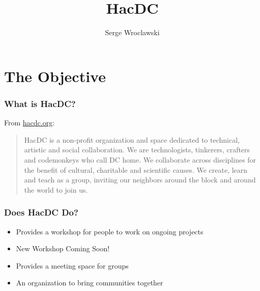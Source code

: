 \documentclass[notes]{beamer}
\title{HacDC}
\author{Serge Wroclawski}
\begin{document}
\section{The Objective}

\begin{frame}
  \frametitle{What is HacDC?}
  From \href{http://www.hacdc.org}{hacdc.org}:
  \begin{quote}
    HacDC is a non-profit organization and space dedicated to
    technical, artistic and social collaboration. We are
    technologists, tinkerers, crafters and codemonkeys who call DC
    home. We collaborate across disciplines for the benefit of
    cultural, charitable and scientific causes. We create, learn and
    teach as a group, inviting our neighbors around the block and
    around the world to join us.
  \end{quote}
\end{frame}

\begin{frame}
  \frametitle{Does HacDC Do?}
  \begin{itemize}
  \item Provides a workshop for people to work on ongoing projects
  \item New Workshop Coming Soon!
  \item Provides a meeting space for groups
  \item An organization to bring communities together
  \end{itemize}
\end{frame}
\end{document}
